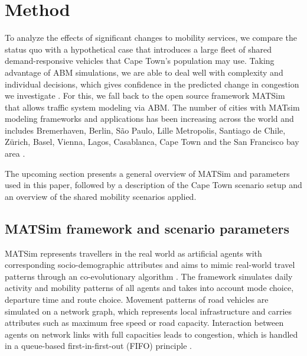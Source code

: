 \documentclass[main.tex]{subfiles}
\begin{document}
\section*{Method}

To analyze the effects of significant changes to mobility services, we compare the status quo with a hypothetical case that introduces a large fleet of shared demand-responsive vehicles that Cape Town's population may use. Taking advantage of ABM simulations, we are able to deal well with complexity and individual decisions, which gives confidence in the predicted change in congestion we investigate \citep{ronald2015simulating}. 
For this, we fall back to the open source framework MATSim that allows traffic system modeling via ABM. The number of cities with MATsim modeling frameworks and applications has been increasing across the world and includes Bremerhaven, Berlin, S\~{a}o Paulo, Lille Metropolis, Santiago de Chile, Z\"{u}rich, Basel, Vienna, Lagos, Casablanca, Cape Town and the San Francisco bay area \citep{schluter2021impact, maciejewski2016congestion, Kaddoura.2020, sallard2020agent, kickhofer2016creating, balac2021synthetic, diallo2021agent, ilahi2019existing, kagho2019agent, becker2018matsim, muller2021matsim, benhlima2021towards}. 



 
The upcoming section presents a general overview of MATSim and parameters used in this paper, followed by a description of the Cape Town scenario setup and an overview of the shared mobility scenarios applied.

\subsection*{MATSim framework and scenario parameters}

MATSim represents travellers in the real world as artificial agents with corresponding socio-demographic attributes and aims to mimic real-world travel patterns through an co-evolutionary algorithm \citep{nnene2023simulation}. The framework simulates daily activity and mobility patterns of all agents and takes into account mode choice, departure time and route choice. Movement patterns of road vehicles are simulated on a network graph, which represents local infrastructure and carries attributes such as maximum free speed or road capacity. Interaction between agents on network links with full capacities leads to congestion, which is handled in a queue-based first-in-first-out (FIFO) principle \citep{Horni.2016}. 
\end{document}
